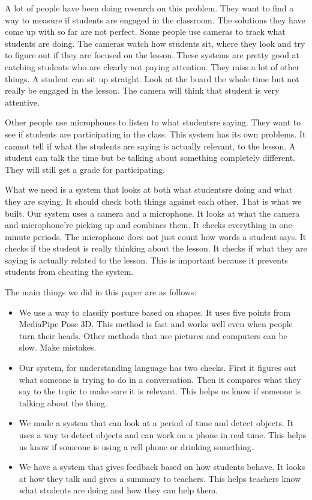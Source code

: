 \documentclass[conference]{IEEEtran}
\begin{document}
A lot of people have been doing research on this problem. They want to find a way to measure if students are engaged in the classroom. The solutions they have come up with so far are not perfect. Some people use cameras to track what students are doing. The cameras watch how students sit, where they look and try to figure out if they are focused on the lesson. These systems are pretty good at catching students who are clearly not paying attention. They miss a lot of other things. A student can sit up straight. Look at the board the whole time but not really be engaged in the lesson. The camera will think that student is very attentive.

Other people use microphones to listen to what studentsre saying. They want to see if students are participating in the class. This system has its own problems. It cannot tell if what the students are saying is actually relevant, to the lesson. A student can talk the time but be talking about something completely different. They will still get a grade for participating.

What we need is a system that looks at both what studentsre doing and what they are saying. It should check both things against each other. That is what we built. Our system uses a camera and a microphone. It looks at what the camera and microphone're picking up and combines them. It checks everything in one-minute periods. The microphone does not just count how words a student says. It checks if the student is really thinking about the lesson. It checks if what they are saying is actually related to the lesson. This is important because it prevents students from cheating the system.

The main things we did in this paper are as follows:
\begin{itemize}
    \item We use a way to classify posture based on shapes. It uses five points from MediaPipe Pose 3D. This method is fast and works well even when people turn their heads. Other methods that use pictures and computers can be slow. Make mistakes.
    \item Our system, for understanding language has two checks. First it figures out what someone is trying to do in a conversation. Then it compares what they say to the topic to make sure it is relevant. This helps us know if someone is talking about the thing.
    \item We made a system that can look at a period of time and detect objects. It uses a way to detect objects and can work on a phone in real time. This helps us know if someone is using a cell phone or drinking something.
    \item We have a system that gives feedback based on how students behave. It looks at how they talk and gives a summary to teachers. This helps teachers know what students are doing and how they can help them.
\end{itemize}
\end{document}
